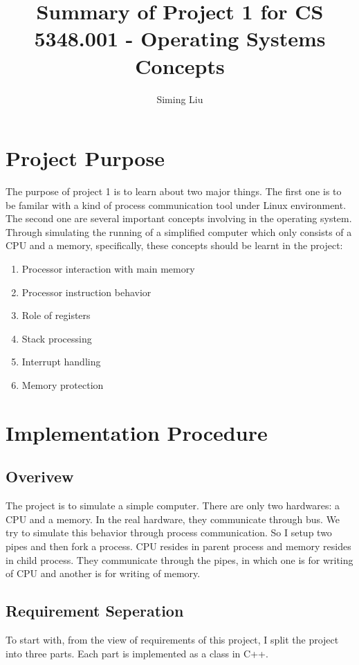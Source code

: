 \documentclass[a4paper]{report}
\begin{document}
\title{Summary of Project 1 for CS 5348.001 - Operating Systems Concepts}

\author{Siming Liu}

\maketitle{}

\section*{Project Purpose}
The purpose of project 1 is to learn about two major things. The first one is to be familar with a kind of process communication tool under Linux environment. The second one are several important concepts involving in the operating system. Through simulating the running of a simplified computer which only consists of a CPU and a memory, specifically, these concepts should be learnt in the project:
\begin{enumerate}[label=\textbf{\textit{\alph*}})]
  \item Processor interaction with main memory
  \item Processor instruction behavior
  \item Role of registers
  \item Stack processing
  \item Interrupt handling
  \item Memory protection
\end{enumerate}

\section*{Implementation Procedure}
\subsection*{Overivew}
The project is to simulate a simple computer. There are only two hardwares: a CPU and a memory. In the real hardware, they communicate through bus. We try to simulate this behavior through process communication. So I setup two pipes and then fork a process. CPU resides in parent process and memory resides in child process. They communicate through the pipes, in which one is for writing of CPU and another is for writing of memory.

\subsection*{Requirement Seperation}
To start with, from the view of requirements of this project, I split the project into three parts. Each part is implemented as a class in C++.
\end{document}
